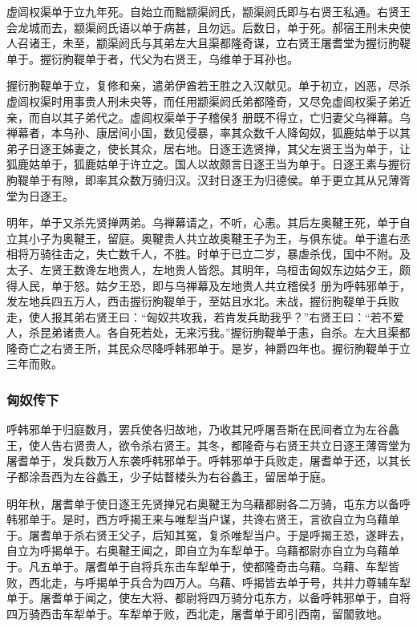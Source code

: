 \documentclass[]{article}
\begin{document}
虚闾权渠单于立九年死。自始立而黜颛渠阏氏，颛渠阏氏即与右贤王私通。右贤王会龙城而去，颛渠阏氏语以单于病甚，且勿远。后数日，单于死。郝宿王刑未央使人召诸王，未至，颛渠阏氏与其弟左大且渠都隆奇谋，立右贤王屠耆堂为握衍朐鞮单于。握衍朐鞮单于者，代父为右贤王，乌维单于耳孙也。

握衍朐鞮单于立，复修和亲，遣弟伊酋若王胜之入汉献见。单于初立，凶恶，尽杀虚闾权渠时用事贵人刑未央等，而任用颛渠阏氏弟都隆奇，又尽免虚闾权渠子弟近亲，而自以其子弟代之。虚闾权渠单于子稽侯犭册既不得立，亡归妻父乌禅幕。乌禅幕者，本乌孙、康居间小国，数见侵暴，率其众数千人降匈奴，狐鹿姑单于以其弟子日逐王姊妻之，使长其众，居右地。日逐王选贤掸，其父左贤王当为单于，让狐鹿姑单于，狐鹿姑单于许立之。国人以故颇言日逐王当为单于。日逐王素与握衍朐鞮单于有隙，即率其众数万骑归汉。汉封日逐王为归德侯。单于更立其从兄薄胥堂为日逐王。

明年，单于又杀先贤掸两弟。乌禅幕请之，不听，心恚。其后左奥鞬王死，单于自立其小子为奥鞬王，留庭。奥鞬贵人共立故奥鞬王子为王，与俱东徙。单于遣右丞相将万骑往击之，失亡数千人，不胜。时单于已立二岁，暴虐杀伐，国中不附。及太子、左贤王数谗左地贵人，左地贵人皆怨。其明年，乌桓击匈奴东边姑夕王，颇得人民，单于怒。姑夕王恐，即与乌禅幕及左地贵人共立稽侯犭册为呼韩邪单于，发左地兵四五万人，西击握衍朐鞮单于，至姑且水北。未战，握衍朐鞮单于兵败走，使人报其弟右贤王曰：``匈奴共攻我，若肯发兵助我乎？''右贤王曰：``若不爱人，杀昆弟诸贵人。各自死若处，无来污我。''握衍朐鞮单于恚，自杀。左大且渠都隆奇亡之右贤王所，其民众尽降呼韩邪单于。是岁，神爵四年也。握衍朐鞮单于立三年而败。

\hypertarget{header-n6253}{%
\subsubsection{匈奴传下}\label{header-n6253}}

呼韩邪单于归庭数月，罢兵使各归故地，乃收其兄呼屠吾斯在民间者立为左谷蠡王，使人告右贤贵人，欲令杀右贤王。其冬，都隆奇与右贤王共立日逐王薄胥堂为屠耆单于，发兵数万人东袭呼韩邪单于。呼韩邪单于兵败走，屠耆单于还，以其长子都涂吾西为左谷蠡王，少子姑瞀楼头为右谷蠡王，留居单于庭。

明年秋，屠耆单于使日逐王先贤掸兄右奥鞬王为乌藉都尉各二万骑，屯东方以备呼韩邪单于。是时，西方呼揭王来与唯犁当户谋，共谗右贤王，言欲自立为乌藉单于。屠耆单于杀右贤王父子，后知其冤，复杀唯犁当户。于是呼揭王恐，遂畔去，自立为呼揭单于。右奥鞬王闻之，即自立为车犁单于。乌藉都尉亦自立为乌藉单于。凡五单于。屠耆单于自将兵东击车犁单于，使都隆奇击乌藉。乌藉、车犁皆败，西北走，与呼揭单于兵合为四万人。乌藉、呼揭皆去单于号，共并力尊辅车犁单于。屠耆单于闻之，使左大将、都尉将四万骑分屯东方，以备呼韩邪单于，自将四万骑西击车犁单于。车犁单于败，西北走，屠耆单于即引西南，留闟敦地。
\end{document}
